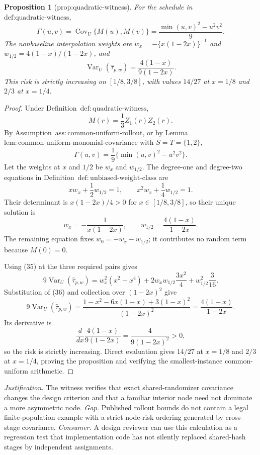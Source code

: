 \documentclass{article}
\newtheorem{proposition}{Proposition}
\begin{document}
\begin{proposition}[prop:quadratic-witness]\label{prop:quadratic-witness}
For the schedule in \(\text{def:quadratic-witness}\), \[\Gamma(u,v)=\operatorname{Cov}_U\{M(u),M(v)\}=\frac{\min(u,v)^2-u^2v^2}{9}.\] The nonbaseline interpolation weights are \(w_x=-\{x(1-2x)\}^{-1}\) and \(w_{1/2}=4(1-x)/(1-2x)\), and \[\operatorname{Var}_U(\widehat\tau_{p,w})=\frac{4(1-x)}{9(1-2x)}.\] This risk is strictly increasing on \([1/8,3/8]\), with values \(14/27\) at \(x=1/8\) and \(2/3\) at \(x=1/4\).
\end{proposition}
\begin{proof}
Under Definition~\(\mathrm{def{:}quadratic\text{-}witness}\),
\[
M(r)=\frac13Z_1(r)Z_2(r).
\]
By Assumption~\(\mathrm{ass{:}common\text{-}uniform\text{-}rollout}\), or by Lemma~\(\mathrm{lem{:}common\text{-}uniform\text{-}monomial\text{-}covariance}\) with \(S=T=\{1,2\}\),
\[
\Gamma(u,v)=\frac19\{\min(u,v)^2-u^2v^2\}.
\tag{35}
\]
Let the weights at \(x\) and \(1/2\) be \(w_x\) and \(w_{1/2}\).  The degree-one and degree-two equations in Definition~\(\mathrm{def{:}unbiased\text{-}weight\text{-}class}\) are
\[
xw_x+\frac12w_{1/2}=1,
\qquad
x^2w_x+\frac14w_{1/2}=1.
\]
Their determinant is \(x(1-2x)/4>0\) for \(x\in[1/8,3/8]\), so their unique solution is
\[
w_x=-\frac1{x(1-2x)},
\qquad
w_{1/2}=\frac{4(1-x)}{1-2x}.
\tag{36}
\]
The remaining equation fixes \(w_0=-w_x-w_{1/2}\); it contributes no random term because \(M(0)=0\).

Using (35) at the three required pairs gives
\[
9\operatorname{Var}_U(\widehat\tau_{p,w})
=w_x^2(x^2-x^4)
+2w_xw_{1/2}\frac{3x^2}{4}
+w_{1/2}^2\frac3{16}.
\]
Substitution of (36) and collection over \((1-2x)^2\) give
\[
9\operatorname{Var}_U(\widehat\tau_{p,w})
=\frac{1-x^2-6x(1-x)+3(1-x)^2}{(1-2x)^2}
=\frac{4(1-x)}{1-2x}.
\]
Its derivative is
\[
\frac{d}{dx}\frac{4(1-x)}{9(1-2x)}
=\frac4{9(1-2x)^2}>0,
\]
so the risk is strictly increasing.  Direct evaluation gives \(14/27\) at \(x=1/8\) and \(2/3\) at \(x=1/4\), proving the proposition and verifying the smallest-instance common-uniform arithmetic.
\end{proof}
\par\smallskip\noindent \textit{Justification.} The witness verifies that exact shared-randomizer covariance changes the design criterion and that a familiar interior node need not dominate a more asymmetric node. \textit{Gap.} Published rollout bounds do not contain a legal finite-population example with a strict node-risk ordering generated by cross-stage covariance. \textit{Consumer.} A design reviewer can use this calculation as a regression test that implementation code has not silently replaced shared-hash stages by independent assignments.
\end{document}
